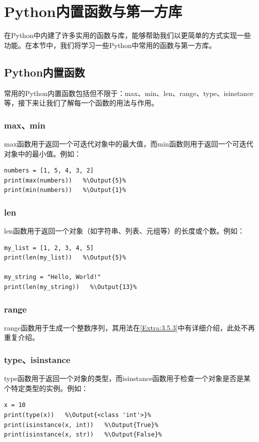 \documentclass[../../Main.tex]{subfiles}
\begin{document}
\section{Python内置函数与第一方库}
在Python中内建了许多实用的函数与库，能够帮助我们以更简单的方式实现一些功能。在本节中，我们将学习一些Python中常用的函数与第一方库。

\subsection{Python内置函数}
常用的Python内置函数包括但不限于：max、min、len、range、type、isinstance等，接下来让我们了解每一个函数的用法与作用。

\subsubsection{max、min}
max函数用于返回一个可迭代对象中的最大值，而min函数则用于返回一个可迭代对象中的最小值。例如：
\begin{lstlisting}
numbers = [1, 5, 4, 3, 2]
print(max(numbers))   %\Output{5}%
print(min(numbers))   %\Output{1}%
\end{lstlisting}

\subsubsection{len}
len函数用于返回一个对象（如字符串、列表、元组等）的长度或个数。例如：
\begin{lstlisting}
my_list = [1, 2, 3, 4, 5]
print(len(my_list))   %\Output{5}%

my_string = "Hello, World!"
print(len(my_string))   %\Output{13}%
\end{lstlisting}

\subsubsection{range}
range函数用于生成一个整数序列，其用法在\ref{Extra:3.5.3}中有详细介绍，此处不再重复介绍。

\subsubsection{type、isinstance}
type函数用于返回一个对象的类型，而isinstance函数用于检查一个对象是否是某个特定类型的实例。例如：
\begin{lstlisting}
x = 10
print(type(x))   %\Output{<class 'int'>}%
print(isinstance(x, int))   %\Output{True}%
print(isinstance(x, str))   %\Output{False}%
\end{lstlisting}
\end{document}
